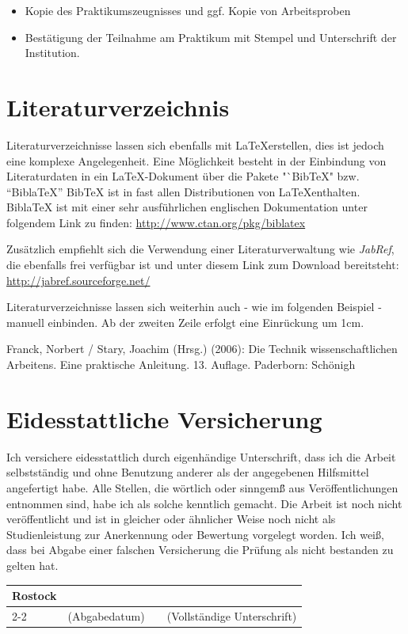 \documentclass{Vorlage}
\begin{document}
\begin{itemize}

\item Kopie des Praktikumszeugnisses und ggf. Kopie von Arbeitsproben

\item Best\"atigung der Teilnahme am Praktikum mit Stempel und Unterschrift der Institution.

\end{itemize}

\newpage

\section{Literaturverzeichnis}

Literaturverzeichnisse lassen sich ebenfalls mit \LaTeX erstellen, dies ist jedoch eine komplexe Angelegenheit. Eine M\"oglichkeit besteht in der Einbindung von Literaturdaten in ein \LaTeX-Dokument \"uber die Pakete "`BibTeX" bzw. "`BiblaTeX"' BibTeX ist in fast allen Distributionen von \LaTeX enthalten. BiblaTeX ist mit einer sehr ausf\"uhrlichen englischen Dokumentation unter folgendem Link zu finden: \url{http://www.ctan.org/pkg/biblatex}

Zus\"atzlich empfiehlt sich die Verwendung einer Literaturverwaltung wie \textit{JabRef}, die ebenfalls frei verf\"ugbar ist und unter diesem Link zum Download bereitsteht: \url{http://jabref.sourceforge.net/}

Literaturverzeichnisse lassen sich weiterhin auch - wie im folgenden Beispiel - manuell einbinden. Ab der zweiten Zeile erfolgt eine Einr\"uckung um 1cm.

\begin{description} %

\item Franck, Norbert / Stary, Joachim (Hrsg.) (2006): Die Technik wissenschaftlichen Arbeitens. Eine praktische Anleitung. 13. Auflage. Paderborn: Sch\"onigh

\end{description}

\newpage

\section{Eidesstattliche Versicherung}

Ich versichere eidesstattlich durch eigenh\"andige Unterschrift, dass ich die Arbeit selbstst\"andig und ohne Benutzung anderer als der angegebenen Hilfsmittel angefertigt habe. Alle Stellen, die w\"ortlich oder sinngem\"\ss{} aus Ver\"offentlichungen entnommen sind, habe ich als solche kenntlich gemacht. Die Arbeit ist noch nicht ver\"offentlicht und ist in gleicher oder \"ahnlicher Weise noch nicht als Studienleistung zur Anerkennung oder Bewertung vorgelegt worden. Ich wei\ss{}, dass bei Abgabe einer falschen Versicherung die Pr\"ufung als nicht bestanden zu gelten hat.

\vspace*{1cm}

\begin{table}[h]
\centering
\begin{tabular}{p{3cm} p{4cm} p{0.5cm} p{6cm}}
Rostock & & &\\[0.5cm]
\cline{2-2} \cline{4-4}
& (Abgabedatum) & & (Vollst\"andige Unterschrift)\\
\end{tabular}
\end{table}
\end{document}
